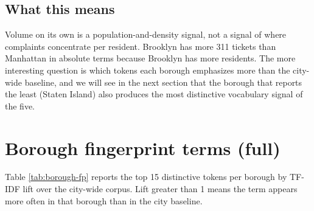 \documentclass[11pt,letterpaper]{book}
\begin{document}
\subsection*{What this means}

Volume on its own is a population-and-density signal, not a signal of where complaints concentrate per resident. Brooklyn has more 311 tickets than Manhattan in absolute terms because Brooklyn has more residents. The more interesting question is which tokens each borough emphasizes more than the city-wide baseline, and we will see in the next section that the borough that reports the least (Staten Island) also produces the most distinctive vocabulary signal of the five.

\section{Borough fingerprint terms (full)}
\label{sec:results-borough-fp}

Table \ref{tab:borough-fp} reports the top 15 distinctive tokens per borough by TF-IDF lift over the city-wide corpus. Lift greater than 1 means the term appears more often in that borough than in the city baseline.
\end{document}

